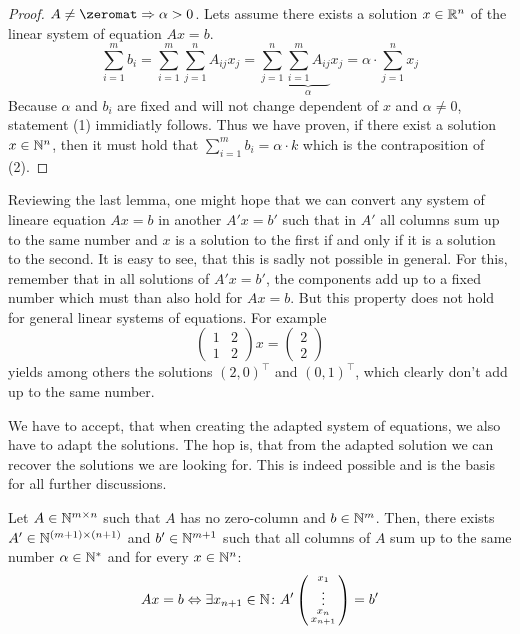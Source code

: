 \begin{proof}
    $A \neq \zeromat \Rightarrow \alpha > 0$. Lets assume there exists a solution $x \in \mathbb{R}^n$ of the linear system of equation $Ax=b$.
    $$\sum_{i=1}^m b_i = \sum_{i=1}^{m}\sum_{j=1}^{n}A_{ij} x_j = \sum_{j=1}^{n}\underbrace{\sum_{i=1}^{m}A_{ij}}_\alpha x_j = \alpha \cdot \sum_{j=1}^{n}x_j$$
    Because $\alpha$ and $b_i$ are fixed and will not change dependent of $x$ and $\alpha \neq 0$, statement (1) immidiatly follows. Thus we have proven, if there exist a solution $x \in \mathbb{N}^n$, then it must hold that $\sum_{i=1}^{m}b_i = \alpha \cdot k$ which is the contraposition of (2).
\end{proof}
Reviewing the last lemma, one might hope that we can convert any system of lineare equation $Ax = b$ in another $A'x = b'$ such that in $A'$ all columns sum up to the same number and $x$ is a solution to the first if and only if it is a solution to the second. It is easy to see, that this is sadly not possible in general. For this, remember that in all solutions of $A'x=b'$, the components add up to a fixed number which must than also hold for $Ax=b$. But this property does not hold for general linear systems of equations. For example
$$
\left(\begin{matrix}
    1 & 2\\
    1 & 2
\end{matrix}\right)
x = \left(\begin{matrix}
    2\\2
\end{matrix}\right)
$$
yields among others the solutions $(2, 0)^\top$ and $(0, 1)^\top$, which clearly don't add up to the same number. 

We have to accept, that when creating the adapted system of equations, we also have to adapt the solutions. The hop is, that from the adapted solution we can recover the solutions we are looking for. This is indeed possible and is the basis for all further discussions.

\begin{theorem}
    \label{theorem:column_sum_construction}
    Let $A\in \mathbb{N}^{m \times n}$ such that $A$ has no zero-column and $b \in \mathbb{N}^m$. Then, there exists $A' \in \mathbb{N}^{(m+1) \times (n+1)}$ and $b' \in \mathbb{N}^{m+1}$ such that all columns of $A$ sum up to the same number $\alpha \in \mathbb{N}^*$ and for every $x \in \mathbb{N}^n$:
    $$Ax = b \Leftrightarrow \exists x_{n+1}\in \mathbb{N}\colon A' \left(\begin{smallmatrix}
        x_1\\
        \vdots\\
        x_n\\
        x_{n+1}
    \end{smallmatrix}\right) = b'$$
\end{theorem}

